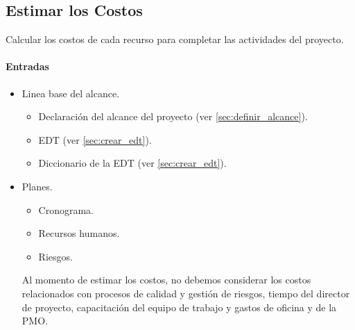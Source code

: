 \documentclass[a4paper,twosides]{article}
\newlength{\wideitemsep}
\let\olditem\item
\renewcommand{\item}{\setlength{\itemsep}{\wideitemsep}\olditem}
\begin{document}
\subsection{Estimar los Costos} \label{sec:estimar_costos}
Calcular los costos de cada recurso para completar las actividades del proyecto.

\paragraph{Entradas}
\begin{itemize}
\item Linea base del alcance.
\begin{itemize}
\item Declaración del alcance del proyecto (ver \ref{sec:definir_alcance}).
\item EDT (ver \ref{sec:crear_edt}).
\item Diccionario de la EDT (ver \ref{sec:crear_edt}). 
\end{itemize}
\item Planes.
\begin{itemize}
\item Cronograma.
\item Recursos humanos.
\item Riesgos.
\end{itemize}
\par Al momento de estimar los costos, no debemos considerar los costos relacionados con procesos de calidad y gestión de riesgos, tiempo del director de proyecto, capacitación del equipo de trabajo y gastos de oficina y de la PMO.
\end{itemize}
\end{document}
